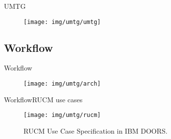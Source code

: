 \documentclass[10pt]{beamer}
\newcommand{\1}{
        	\setbeamertemplate{background}{
        		\texttt{[image: img/1]}
        		\tikz[overlay] \fill[fill opacity=0.75,fill=white] (0,0) rectangle (-\paperwidth,\paperheight);
        	}
}
\begin{document}
\begin{frame}{UMTG}{}	
	\begin{figure}
		\centering
		\texttt{[image: img/umtg/umtg]}
	\end{figure}	
\end{frame}




\subsection{Workflow}



\begin{frame}{Workflow}{}	
	\begin{figure}
		\centering
		\texttt{[image: img/umtg/arch]}
	\end{figure}	
\end{frame}


\begin{frame}{Workflow}{RUCM use cases}	
	\begin{figure}
		\centering
		\texttt{[image: img/umtg/rucm]}
		\caption{RUCM Use Case Specification in IBM DOORS.}
	\end{figure}	
\end{frame}
\end{document}

